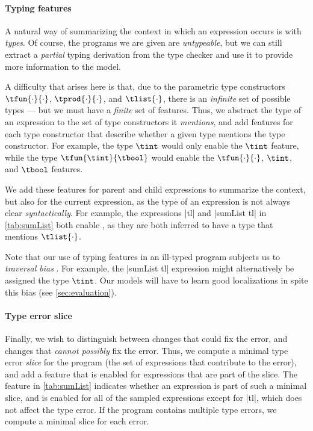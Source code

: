 \paragraph{Typing features}
A natural way of summarizing the context in which an expression occurs is with
\emph{types}. Of course, the programs we are given are \emph{untypeable}, but we
can still extract a \emph{partial} typing derivation from the type checker and
use it to provide more information to the model.

A difficulty that arises here is that, due to the parametric type constructors
$\tfun{\cdot}{\cdot}$, $\tprod{\cdot}{\cdot}$, and $\tlist{\cdot}$, there is an
\emph{infinite} set of possible types --- but we must have a \emph{finite} set
of features. Thus, we abstract the type of an expression to the set of type
constructors it \emph{mentions}, and add features for each type constructor that
describe whether a given type mentions the type constructor. For example, the
type $\tint$ would only enable the $\tint$ feature, while the type
$\tfun{\tint}{\tbool}$ would enable the $\tfun{\cdot}{\cdot}$, $\tint$, and
$\tbool$ features.

We add these features for parent and child expressions to summarize the context,
but also for the current expression, as the type of an expression is not always
clear \emph{syntactically}. For example, the expressions |tl| and |sumList tl|
in \autoref{tab:sumList} both enable \HasTypeList, as they are both inferred to
have a type that mentions $\tlist{\cdot}$.

Note that our use of typing features in an ill-typed program subjects us to
\emph{traversal bias} \citep{McAdam1998-ub}. For example, the |sumList tl|
expression might alternatively be assigned the type $\tint$. Our models will
have to learn good localizations in spite this bias (see
\autoref{sec:evaluation}).

\paragraph{Type error slice}
Finally, we wish to distinguish between changes that could fix the error, and
changes that \emph{cannot possibly} fix the error. Thus, we compute a minimal
type error \emph{slice} for the program (\ie the set of expressions that
contribute to the error), and add a feature that is enabled for expressions that
are part of the slice. The \InSlice feature in \autoref{tab:sumList} indicates
whether an expression is part of such a minimal slice, and is enabled for all of
the sampled expressions except for |tl|, which does not affect the type error.
If the program contains multiple type errors, we compute a minimal slice for
each error.

